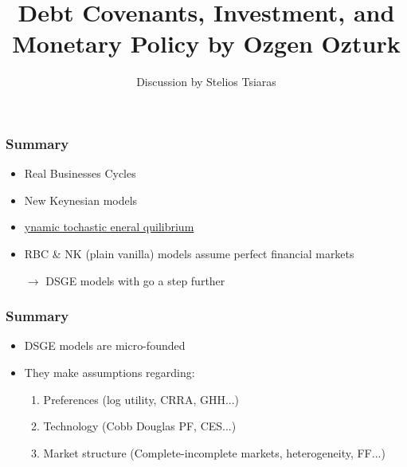 \documentclass[xcolor=dvipsnames,handout]{beamer}
\title[\today]{\textbf{Debt Covenants, Investment, and Monetary Policy by Ozgen Ozturk}}
\author{Discussion by Stelios Tsiaras}
\institute{European University Institute}
\begin{document}
\begin{frame}[noframenumbering]
\titlepage 
\end{frame}

\begin{frame}[c]\frametitle {\textbf{Summary}} \label{conclusion}
\begin{itemize}
    \setlength\itemsep{2em}
    \item Real Businesses Cycles 
    \item New Keynesian models 
    \item \underline{{\color{blue}{D}}ynamic {\color{blue}{S}}tochastic {\color{blue}{G}}eneral {\color{blue}{E}}quilibrium}
    \item RBC \& NK (plain vanilla) models assume perfect financial markets 

$\rightarrow$ DSGE models with {\color{blue}{financial frictions}} go a step further
\end{itemize}
\end{frame}

\begin{frame}[c]\frametitle {\textbf{Summary}} \label{conclusion}
\begin{itemize}
    \setlength\itemsep{2em}
\item DSGE models are micro-founded 
\item They make assumptions regarding: 
\begin{enumerate}
    \item Preferences (log utility, CRRA, GHH...)
    \item Technology (Cobb Douglas PF, CES...)
    \item Market structure (Complete-incomplete markets, heterogeneity, FF...)
\end{enumerate}

\end{itemize}
\end{frame}
\end{document}
